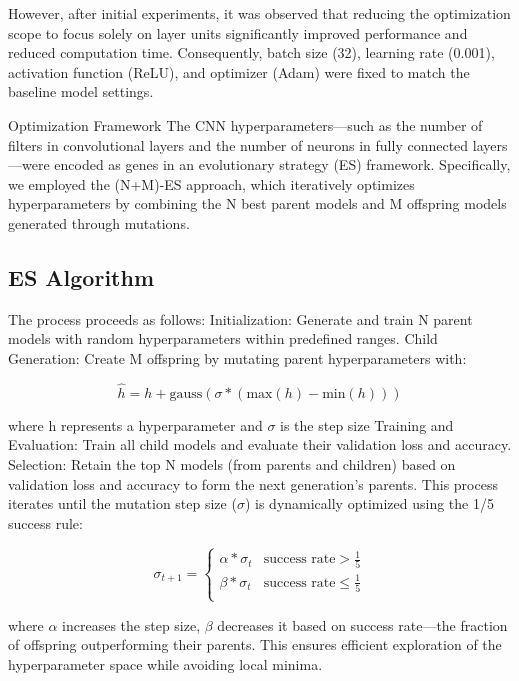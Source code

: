 \documentclass[conference]{IEEEtran}
\begin{document}
However, after initial experiments, it was observed that reducing the optimization scope to focus solely on layer units significantly improved performance and reduced computation time. Consequently, batch size (32), learning rate (0.001), activation function (ReLU), and optimizer (Adam) were fixed to match the baseline model settings.

Optimization Framework
The CNN hyperparameters—such as the number of filters in convolutional layers and the number of neurons in fully connected layers—were encoded as genes in an evolutionary strategy (ES) framework. Specifically, we employed the (N+M)-ES approach, which iteratively optimizes hyperparameters by combining the N best parent models and M offspring models generated through mutations.


\subsection{ES Algorithm}
The process proceeds as follows:
Initialization: Generate and train N parent models with random hyperparameters within predefined ranges.
Child Generation: Create M offspring by mutating parent hyperparameters with: 

\begin{equation}
    \hat{h} = h + \text{gauss}(\sigma * (\text{max}(h) - \text{min}(h)))
\end{equation}


where h represents a hyperparameter and $\sigma$ is the step size
Training and Evaluation: Train all child models and evaluate their validation loss and accuracy.
Selection: Retain the top N models (from parents and children) based on validation loss and accuracy to form the next generation's parents.
This process iterates until the mutation step size ($\sigma$) is dynamically optimized using the 1/5 success rule:

\begin{equation}
    \sigma_{t+1} = \left\{
    \begin{array}{ll}
    \alpha * \sigma_t & \text{success rate} > \frac{1}{5} \\
    \beta * \sigma_t & \text{success rate} \leq \frac{1}{5} \\
    \end{array}
    \right.
\end{equation}


where $\alpha$ increases the step size, $\beta$ decreases it based on success rate—the fraction of offspring outperforming their parents. This ensures efficient exploration of the hyperparameter space while avoiding local minima.
\end{document}
